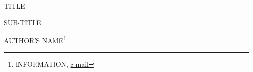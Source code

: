 \documentclass[11pt,a4paper]{article}
\begin{document}
{\doublespacing
\begin{center}
\begin{huge}
TITLE
\end{huge}

\begin{large}
SUB-TITLE
\end{large}
\vspace{0.5cm}

\renewcommand*{\thefootnote}{\fnsymbol{footnote}}
AUTHOR'S NAME\footnote{INFORMATION, \url{e-mail}}
\end{center}
}
\vspace{0.8cm}

\renewcommand*{\thefootnote}{\arabic{footnote}}
\setcounter{footnote}{0}


\newpage
{}

\nocite{*}
\end{document}
